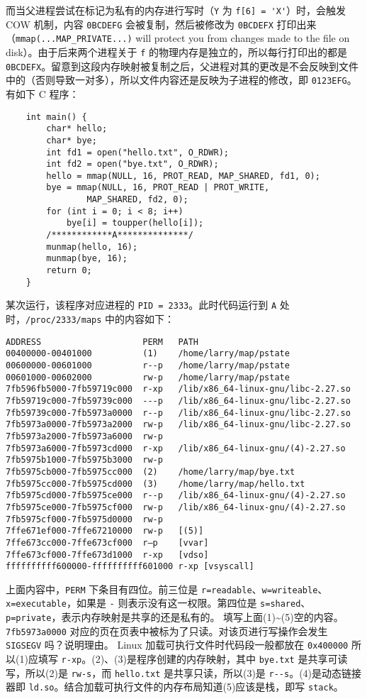 \begin{problems}
        而当父进程尝试在标记为私有的内存进行写时（\verb|Y| 为 \verb|f[6] = 'X'|）时，会触发 COW 机制，内容 \verb|0BCDEFG| 会被复制，然后被修改为 \verb|0BCDEFX| 打印出来（\verb|mmap(...MAP_PRIVATE...)| will protect you from changes made to the file on disk）。由于后来两个进程关于 \verb|f| 的物理内存是独立的，所以每行打印出的都是 \verb|0BCDEFX|。留意到这段内存映射被复制之后，父进程对其的更改是不会反映到文件中的（否则导致一对多），所以文件内容还是反映为子进程的修改，即 \verb|0123EFG|。
        \pro 有如下 C 程序：
        \begin{verbatim}
    int main() {
        char* hello;
        char* bye;
        int fd1 = open("hello.txt", O_RDWR);
        int fd2 = open("bye.txt", O_RDWR);
        hello = mmap(NULL, 16, PROT_READ, MAP_SHARED, fd1, 0);
        bye = mmap(NULL, 16, PROT_READ | PROT_WRITE,
                MAP_SHARED, fd2, 0);
        for (int i = 0; i < 8; i++)
            bye[i] = toupper(hello[i]);
        /************A**************/
        munmap(hello, 16);
        munmap(bye, 16);
        return 0;
    }
        \end{verbatim}
        某次运行，该程序对应进程的 \verb|PID = 2333|。此时代码运行到 \verb|A| 处时，\verb|/proc/2333/maps| 中的内容如下：
        \begin{verbatim}
ADDRESS                    PERM   PATH 
00400000-00401000          (1)    /home/larry/map/pstate 
00600000-00601000          r--p   /home/larry/map/pstate 
00601000-00602000          rw-p   /home/larry/map/pstate 
7fb596fb5000-7fb59719c000  r-xp   /lib/x86_64-linux-gnu/libc-2.27.so
7fb59719c000-7fb59739c000  ---p   /lib/x86_64-linux-gnu/libc-2.27.so
7fb59739c000-7fb5973a0000  r--p   /lib/x86_64-linux-gnu/libc-2.27.so
7fb5973a0000-7fb5973a2000  rw-p   /lib/x86_64-linux-gnu/libc-2.27.so 
7fb5973a2000-7fb5973a6000  rw-p  
7fb5973a6000-7fb5973cd000  r-xp   /lib/x86_64-linux-gnu/(4)-2.27.so 
7fb5975b1000-7fb5975b3000  rw-p  
7fb5975cb000-7fb5975cc000  (2)    /home/larry/map/bye.txt 
7fb5975cc000-7fb5975cd000  (3)    /home/larry/map/hello.txt 
7fb5975cd000-7fb5975ce000  r--p   /lib/x86_64-linux-gnu/(4)-2.27.so
7fb5975ce000-7fb5975cf000  rw-p   /lib/x86_64-linux-gnu/(4)-2.27.so 
7fb5975cf000-7fb5975d0000  rw-p  
7ffe671ef000-7ffe67210000  rw-p   [(5)] 
7ffe673cc000-7ffe673cf000  r—p    [vvar]
7ffe673cf000-7ffe673d1000  r-xp   [vdso] 
ffffffffff600000-ffffffffff601000 r-xp [vsyscall]
        \end{verbatim}
        上面内容中，\verb|PERM| 下条目有四位。前三位是 \verb|r=readable|、\verb|w=writeable|、\verb|x=executable|，如果是 \verb|-| 则表示没有这一权限。第四位是 \verb|s=shared|、\verb|p=private|，表示内存映射是共享的还是私有的。
            \qn 填写上面(1)\textasciitilde(5)空的内容。
            \qn \verb|7fb5973a0000| 对应的页在页表中被标为了只读。对该页进行写操作会发生 \verb|SIGSEGV| 吗？说明理由。
        \sol Linux 加载可执行文件时代码段一般都放在 \verb|0x400000| 所以(1)应填写 \verb|r-xp|。(2)、(3)是程序创建的内存映射，其中 \verb|bye.txt| 是共享可读写，所以(2)是 \verb|rw-s|，而 \verb|hello.txt| 是共享只读，所以(3)是 \verb|r--s|。(4)是动态链接器即 \verb|ld.so|。结合加载可执行文件的内存布局知道(5)应该是栈，即写 \verb|stack|。


\end{problems}

